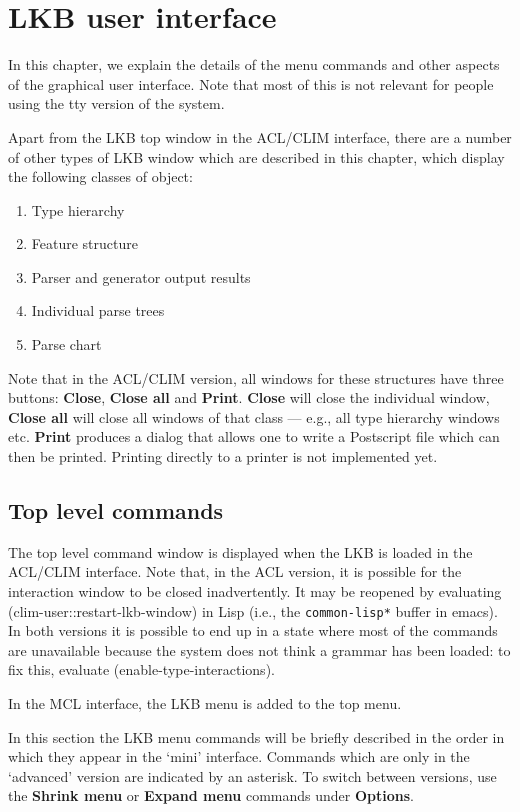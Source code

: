 \documentclass[12pt]{report}
\newcommand{\lkbmenucommand}{\bf}
\begin{document}
\chapter{LKB user interface}
\label{ui}

In this chapter, we explain the details of the menu commands
and other aspects of the graphical user interface.
Note that most of this is not relevant for people using the tty version
of the system.

Apart from the LKB top window in the ACL/CLIM interface, there are
a number of other types of LKB window which are described in this chapter,
which display the following classes of object:
\begin{enumerate}
\item Type hierarchy
\item Feature structure 
\item Parser and generator output results
\item Individual parse trees
\item Parse chart
\end{enumerate}
Note that in the ACL/CLIM version, all windows for these structures
have three buttons: {\lkbmenucommand Close}, {\lkbmenucommand Close all}
and {\lkbmenucommand Print}.
{\lkbmenucommand Close} will close the individual window, {\lkbmenucommand Close all}
will close all windows of that class --- e.g., all type hierarchy windows
etc.
{\lkbmenucommand Print} produces a dialog
that allows one to write a Postscript file which can then
be printed.  Printing directly to a printer
is not implemented yet.

\section{Top level commands}

The top level command window is displayed when the LKB is loaded
in the ACL/CLIM interface.
Note that, in the ACL version, it is possible for the interaction
window to be closed inadvertently.
It may be reopened by evaluating
(clim-user::restart-lkb-window) in Lisp (i.e., the
{\tt *common-lisp*} buffer in emacs).
In both versions it is possible to end up in a state 
where most of the commands are unavailable because the system
does not think a grammar has been loaded: to
fix this, evaluate (enable-type-interactions).

In the MCL interface, the LKB menu is added to the top menu.

In this section the LKB menu
commands will be briefly described in the order in
which they appear in the `mini' interface.
Commands which are only in the `advanced' version are indicated by
an asterisk.  To switch between versions, use the {\lkbmenucommand Shrink menu}
or {\lkbmenucommand Expand menu} commands under {\lkbmenucommand Options}.
\end{document}
